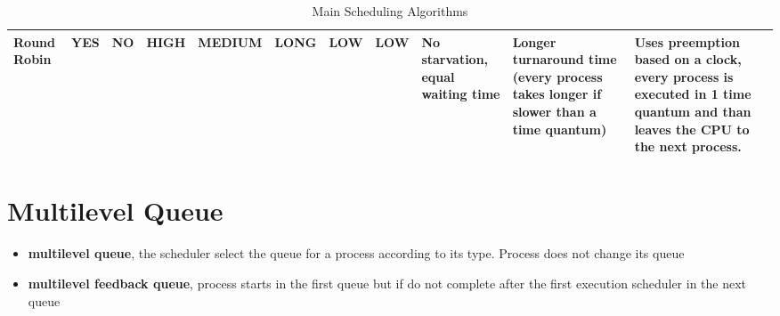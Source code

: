 \begin{table}[]
{\begin{tabular}{|m{}|m{}|m{}|m{}|m{}|m{}|m{}|m{}|m{}|m{}|m{}|}
			Round Robin                          & YES                 & NO                & HIGH                     & MEDIUM             & LONG                                                 & LOW                                             & LOW                                             & No starvation, equal waiting time                                                                                                      & Longer turnaround time (every process takes longer if slower than a time quantum)                       & Uses preemption based on a clock, every process is executed in 1 time quantum and than leaves the CPU to the next process. \\ \hline
		\end{tabular}%
	}
	\caption{Main Scheduling Algorithms}
	\label{Tab:Algorithms}
\end{table}

\pagebreak

\section{Multilevel Queue}
\begin{itemize}
	\item{\textbf{multilevel queue}}, the scheduler select the queue for a process according to its type. Process does not change its queue
	\item{\textbf{multilevel feedback queue}}, process starts in the first queue but if do not complete after the first execution scheduler in the next queue
\end{itemize}

